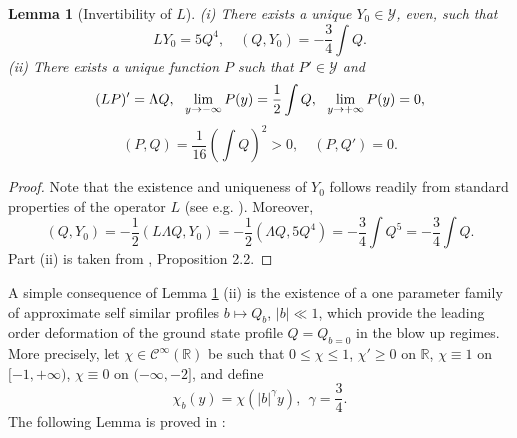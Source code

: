 \documentclass[11pt,a4paper,reqno]{amsart}
\newtheorem{lemma}[theorem]{Lemma}
\theoremstyle{remark}
\numberwithin{equation}{section}
\newcommand{\be}{\begin{equation}}
\newcommand{\ee}{\end{equation}}
\def\lim{\mathop{\rm lim}}
\def\cal{\mathcal}
\def\Yz{Y_0}
\begin{document}
\begin{lemma}[Invertibility of $L$]
\label{lemmainvert}
{\rm (i)} There exists a unique $\Yz\in \mathcal Y$, even, such that
\be \label{YQ}
L \Yz= 5  Q^4 ,\quad
(Q,\Yz)=-\frac 34 \int Q  .
\ee
{\rm (ii)} There exists a unique function $P$ such that $P' \in \mathcal{Y}$ and
\be
\label{eq:23}
 (L  P)'={\Lambda} Q, \ \  \lim_{y \to -\infty}   P(y) = \frac 12 \int Q,  \ \ \lim_{y \to +\infty}   P(y) =0,
 \ee
 \be
 \label{PQ}
 (P, Q) = \frac 1{16} \left(\int Q\right)^2 > 0,\quad (P,  Q')=0.
 \ee
\end{lemma}
\begin{proof}
Note that the existence and uniqueness of $\Yz$ follows readily from standard properties of the operator $L$ (see e.g. \cite{MMR1}).
Moreover,
$$
(Q,\Yz)= -\frac 12 (L\Lambda Q,\Yz) =-\frac 12(\Lambda Q,5Q^4 )
 =-\frac 34 \int Q^5=-\frac 34 \int Q.
$$
Part (ii)   is taken from \cite{MMR1}, Proposition 2.2.
\end{proof}

A simple consequence of Lemma \ref{lemmainvert} (ii) is the existence of a one parameter family of approximate self similar profiles $b\mapsto Q_b$, $|b|\ll 1$, which provide the leading order deformation of the ground state profile $Q=Q_{b=0}$ in the blow up regimes.  More precisely, let $\chi\in {\cal C}^{\infty}({\mathbb R})$ be such that $0\leq \chi \leq 1$, $\chi'\geq 0$ on $\mathbb{R}$,
$\chi\equiv 1$ on $[-1,+\infty)$, $\chi\equiv 0$ on $(-\infty,-2]$, and define
\begin{equation}\label{defgamma} 
\chi_b(y)= \chi\left(|b|^{\gamma} {y} \right),\ \ \gamma = \frac 34.
\end{equation}
The following Lemma is proved in \cite{MMR1}:
\end{document}
